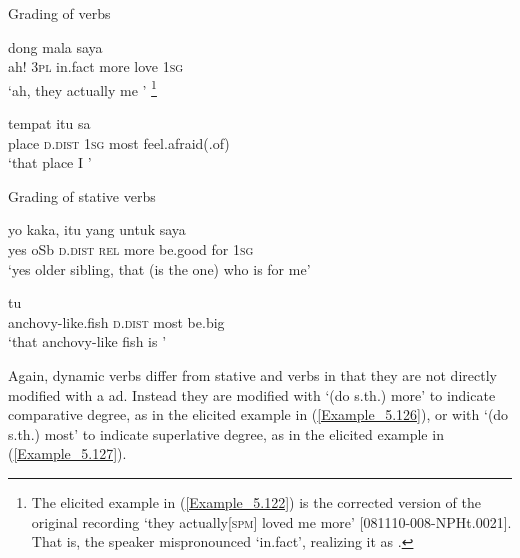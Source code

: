\begin{styleExampleTitle}
Grading of  verbs
\end{styleExampleTitle}

\ea
\label{Example_5.122}
 {dong} {mala} {} {} {saya}\\ %
 ah!  \textsc{3pl}  in.fact  more  love  \textsc{1sg}\\
\glt 
‘ah, they actually  me ’ \textstyleExampleSource{[Elicited BR130221.034]}\footnote{The elicited example in (\ref{Example_5.122}) is the corrected version of the original recording  ‘they actually[\textsc{spm}] loved me more’ [081110-008-NPHt.0021]. That is, the speaker mispronounced  ‘in.fact’, realizing it as .}
\z

\ea
\label{Example_5.123}
\gll  tempat  itu  sa    \\
 place  \textsc{d.dist}  \textsc{1sg}  most  feel.afraid(.of)\\
\glt 
‘that place I ’ \textstyleExampleSource{[081025-006-Cv.0285]}
\z


\begin{styleExampleTitle}
Grading of  stative verbs
\end{styleExampleTitle}

\ea
\label{Example_5.124}
\gll  yo  kaka,  itu  yang      untuk  saya\\
 yes  oSb  \textsc{d.dist}  \textsc{rel}  more  be.good  for  \textsc{1sg}\\
 ‘yes older sibling, that (is the one) who is  for me’ \textstyleExampleSource{[081110-008-CvNP.0178]}
\z

\ea
\label{Example_5.125}
 {tu} {} {}\\ %
 anchovy-like.fish  \textsc{d.dist}  most  be.big\\
\glt 
‘that anchovy-like fish is ’ \textstyleExampleSource{[080927-003-Cv.0002]}
\z


Again,  dynamic verbs differ from  stative and  verbs in that they are not directly modified with a  ad. Instead they are modified with  ‘(do s.th.) more’ to indicate comparative degree, as in the elicited example in (\ref{Example_5.126}), or with  ‘(do s.th.) most’ to indicate superlative degree, as in the elicited example in (\ref{Example_5.127}).

